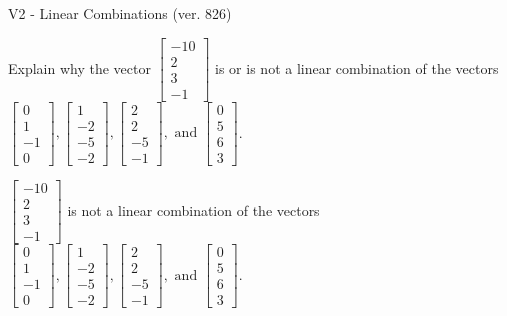 \begin{exercise}
  \begin{exerciseTitle}V2 - Linear Combinations (ver. 826)\end{exerciseTitle}
  \begin{exerciseStatement}
    Explain why the vector \(\left[\begin{array}{c}
-10 \\
2 \\
3 \\
-1
\end{array}\right]\)  is or is not a linear 
	combination of the vectors \(\left[\begin{array}{c}
0 \\
1 \\
-1 \\
0
\end{array}\right] , \left[\begin{array}{c}
1 \\
-2 \\
-5 \\
-2
\end{array}\right] , \left[\begin{array}{c}
2 \\
2 \\
-5 \\
-1
\end{array}\right] , \text{ and } \left[\begin{array}{c}
0 \\
5 \\
6 \\
3
\end{array}\right]\).
	


  \end{exerciseStatement}
  \begin{exerciseAnswer}
   \(\left[\begin{array}{c}
-10 \\
2 \\
3 \\
-1
\end{array}\right]\) 
  	 is not  
	a linear combination of the vectors \(\left[\begin{array}{c}
0 \\
1 \\
-1 \\
0
\end{array}\right] , \left[\begin{array}{c}
1 \\
-2 \\
-5 \\
-2
\end{array}\right] , \left[\begin{array}{c}
2 \\
2 \\
-5 \\
-1
\end{array}\right] , \text{ and } \left[\begin{array}{c}
0 \\
5 \\
6 \\
3
\end{array}\right]\).


\end{exerciseAnswer}
\end{exercise}
